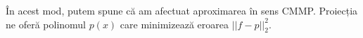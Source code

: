 \documentclass{exam}
\begin{document}
În acest mod, putem spune că am afectuat aproximarea în sens CMMP. Proiecția ne
oferă polinomul $p(x)$ care minimizează eroarea $||f - p||_2^2$.








\end{document}
